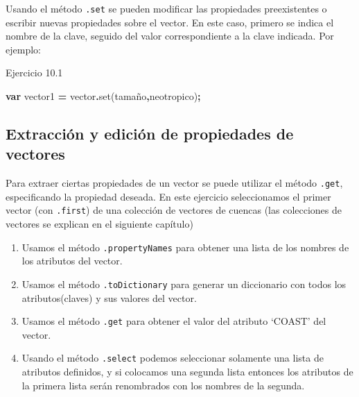 \documentclass[
  12pt,
  letterpaper,
  twoside]{book}
\newenvironment{Shaded}{\begin{snugshade}}{\end{snugshade}}
\newcommand{\FunctionTok}[1]{\textcolor[rgb]{0.00,0.00,0.00}{#1}}
\newcommand{\KeywordTok}[1]{\textcolor[rgb]{0.13,0.29,0.53}{\textbf{#1}}}
\newcommand{\NormalTok}[1]{#1}
\newcommand{\OperatorTok}[1]{\textcolor[rgb]{0.81,0.36,0.00}{\textbf{#1}}}
\newcommand{\StringTok}[1]{\textcolor[rgb]{0.31,0.60,0.02}{#1}}
\providecommand{\tightlist}{%
  \setlength{\itemsep}{0pt}\setlength{\parskip}{0pt}}
\begin{document}
Usando el método \texttt{.set} se pueden modificar las propiedades preexistentes o escribir nuevas propiedades sobre el vector. En este caso, primero se indica el nombre de la clave, seguido del valor correspondiente a la clave indicada. Por ejemplo:

Ejercicio 10.1

\begin{Shaded}
\begin{Highlighting}[]
\KeywordTok{var}\NormalTok{ vector1 }\OperatorTok{=}\NormalTok{ vector}\OperatorTok{.}\FunctionTok{set}\NormalTok{(}\StringTok{\textquotesingle{}tamaño\textquotesingle{}}\OperatorTok{,}\StringTok{\textquotesingle{}neotropico\textquotesingle{}}\NormalTok{)}\OperatorTok{;}
\end{Highlighting}
\end{Shaded}

\hypertarget{extracciuxf3n-y-ediciuxf3n-de-propiedades-de-vectores}{%
\subsection*{Extracción y edición de propiedades de vectores}\label{extracciuxf3n-y-ediciuxf3n-de-propiedades-de-vectores}}

Para extraer ciertas propiedades de un vector se puede utilizar el método \texttt{.get}, especificando la propiedad deseada. En este ejercicio seleccionamos el primer vector (con \texttt{.first}) de una colección de vectores de cuencas (las colecciones de vectores se explican en el siguiente capítulo)

\begin{enumerate}
\def\labelenumi{\arabic{enumi}.}
\tightlist
\item
  Usamos el método \texttt{.propertyNames} para obtener una lista de los nombres de los atributos del vector.
\item
  Usamos el método \texttt{.toDictionary} para generar un diccionario con todos los atributos(claves) y sus valores del vector.
\item
  Usamos el método \texttt{.get} para obtener el valor del atributo `COAST' del vector.
\item
  Usando el método \texttt{.select} podemos seleccionar solamente una lista de atributos definidos, y si colocamos una segunda lista entonces los atributos de la primera lista serán renombrados con los nombres de la segunda.
\end{enumerate}
\end{document}
